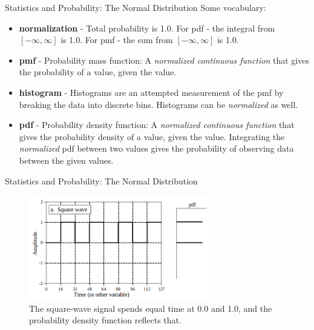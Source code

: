 \documentclass{beamer}
\begin{document}
\begin{frame}[fragile]{Statistics and Probability: The Normal Distribution}
\small
Some vocabulary:
\begin{itemize}
\item \textbf{normalization} - Total probability is 1.0.  For pdf - the integral from $[-\infty,\infty]$ is 1.0.  For pmf - the sum from $[-\infty,\infty]$ is 1.0.
\item \textbf{pmf} - Probability mass function: A \textit{normalized continuous function} that gives the probability of a value, given the value.
\item \textbf{histogram} - Histograms are an attempted measurement of the pmf by breaking the data into discrete bins.  Histograms can be \textit{normalized} as well.
\item \textbf{pdf} - Probability density function: A \textit{normalized continuous function} that gives the probability density of a value, given the value.  Integrating the \textit{normalized} pdf between two values gives the probability of observing data between the given values.
\end{itemize}
\end{frame}

\begin{frame}[fragile]{Statistics and Probability: The Normal Distribution}
\begin{figure}
\centering
\includegraphics[width=0.7\textwidth]{figures/squarepdf.png}
\caption{\label{fig:squarepdf} The square-wave signal spends equal time at 0.0 and 1.0, and the probability density function reflects that.}
\end{figure}
\end{frame}
\end{document}
